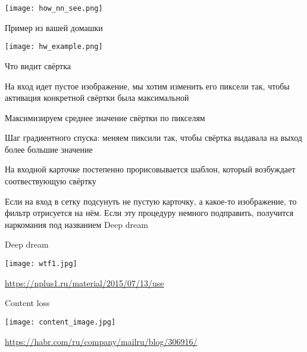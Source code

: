 \documentclass[notes,12pt, aspectratio=169]{beamer}
\newenvironment{wideitemize}{\itemize\addtolength{\itemsep}{10pt}}{\enditemize}
\begin{document}
\begin{frame}
\begin{center}
\texttt{[image: how\_nn\_see.png]}
\end{center}
\end{frame}


\begin{frame}{Пример из вашей домашки}
\begin{center}
\texttt{[image: hw\_example.png]}
\end{center}
\end{frame}

\begin{frame}{Что видит свёртка}
\begin{wideitemize}

\item На вход идет пустое изображение, мы хотим изменить его пиксели так, чтобы активация конкретной свёртки была максимальной 

\item Максимизируем среднее значение свёртки по пикселям 

\item Шаг градиентного спуска: меняем пиксили так, чтобы свёртка выдавала на выход более большие значение 

\item На входной карточке постепенно прорисовывается шаблон, который возбуждает соотвествующую свёртку

\item Если на вход в сетку подсунуть не пустую карточку, а какое-то изображение, то фильтр отрисуется на нём. Если эту процедуру немного подправить, получится наркомания под названием \alert{Deep dream}
\end{wideitemize}
\end{frame}

\begin{frame}{Deep dream}
\begin{center}
\texttt{[image: wtf1.jpg]}
\end{center}
\vfill
\footnotesize
{\color{blue} \url{https://nplus1.ru/material/2015/07/13/use}}
\end{frame}


\begin{frame}{Content loss}
\begin{center}
\texttt{[image: content\_image.jpg]}
\end{center}
\vfill
\footnotesize
{\color{blue} \url{https://habr.com/ru/company/mailru/blog/306916/}}
\end{frame}
\end{document}
